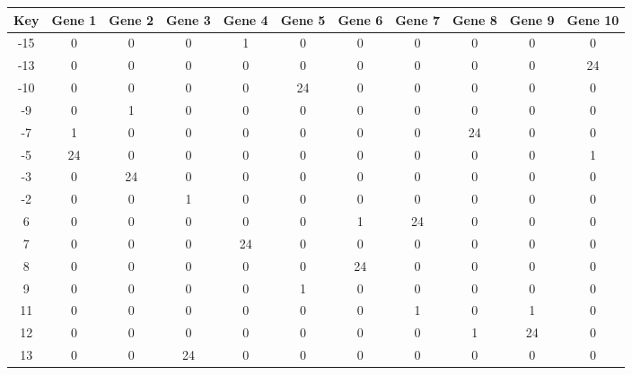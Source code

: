 \begin{tabular}{|c|c|c|c|c|c|c|c|c|c|c|}
\hline
Key & Gene 1 & Gene 2 & Gene 3 & Gene 4 & Gene 5 & Gene 6 & Gene 7 & Gene 8 & Gene 9 & Gene 10 \\
\hline
-15 & 0 & 0 & 0 & 1 & 0 & 0 & 0 & 0 & 0 & 0 \\
-13 & 0 & 0 & 0 & 0 & 0 & 0 & 0 & 0 & 0 & 24 \\
-10 & 0 & 0 & 0 & 0 & 24 & 0 & 0 & 0 & 0 & 0 \\
-9 & 0 & 1 & 0 & 0 & 0 & 0 & 0 & 0 & 0 & 0 \\
-7 & 1 & 0 & 0 & 0 & 0 & 0 & 0 & 24 & 0 & 0 \\
-5 & 24 & 0 & 0 & 0 & 0 & 0 & 0 & 0 & 0 & 1 \\
-3 & 0 & 24 & 0 & 0 & 0 & 0 & 0 & 0 & 0 & 0 \\
-2 & 0 & 0 & 1 & 0 & 0 & 0 & 0 & 0 & 0 & 0 \\
6 & 0 & 0 & 0 & 0 & 0 & 1 & 24 & 0 & 0 & 0 \\
7 & 0 & 0 & 0 & 24 & 0 & 0 & 0 & 0 & 0 & 0 \\
8 & 0 & 0 & 0 & 0 & 0 & 24 & 0 & 0 & 0 & 0 \\
9 & 0 & 0 & 0 & 0 & 1 & 0 & 0 & 0 & 0 & 0 \\
11 & 0 & 0 & 0 & 0 & 0 & 0 & 1 & 0 & 1 & 0 \\
12 & 0 & 0 & 0 & 0 & 0 & 0 & 0 & 1 & 24 & 0 \\
13 & 0 & 0 & 24 & 0 & 0 & 0 & 0 & 0 & 0 & 0 \\
\hline
\end{tabular}